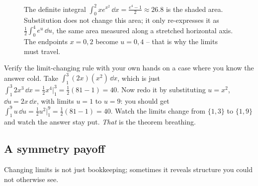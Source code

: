 \begin{figure}[H]
\centering
{}
\caption{The definite integral $\int_0^2 x e^{x^2}\,\dd x = \tfrac{e^4-1}{2}\approx
26.8$ is the shaded area. Substitution does not change this area; it only re-expresses
it as $\tfrac12\int_0^4 e^u\,\dd u$, the same area measured along a stretched
horizontal axis. The endpoints $x=0,2$ become $u=0,4$ -- that is why the limits must
travel.}
\label{ch22:fig-area}
\end{figure}

\begin{labbox}
Verify the limit-changing rule with your own hands on a case where you know the
answer cold. Take $\int_1^3 (2x)(x^2)\,\dd x$, which is just $\int_1^3 2x^3\,\dd x =
\tfrac12 x^4 \big|_1^3 = \tfrac12(81-1) = 40$. Now redo it by substituting $u =
x^2$, $\dd u = 2x\,\dd x$, with limits $u=1$ to $u=9$: you should get $\int_1^9
u\,\dd u = \tfrac12 u^2\big|_1^9 = \tfrac12(81-1) = 40$. Watch the limits change from
$\{1,3\}$ to $\{1,9\}$ and watch the answer stay put. \emph{That} is the theorem
breathing.
\end{labbox}

\subsection{A symmetry payoff}

Changing limits is not just bookkeeping; sometimes it reveals structure you could
not otherwise see.

